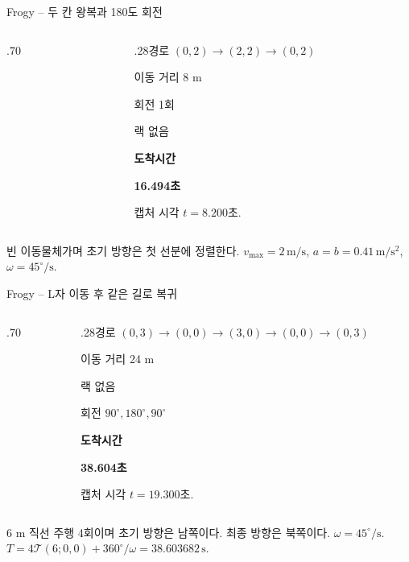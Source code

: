 \begin{frame}{Frogy -- 두 칸 왕복과 180도 회전}
\begin{columns}[T,onlytextwidth]
\begin{column}{.70\textwidth}\end{column}
\begin{column}{.28\textwidth}\small 경로 $(0,2)\to(2,2)\to(0,2)$\par\medskip 이동 거리 8 m\par 회전 1회\par 랙 없음\par\medskip\textbf{도착시간}\par\textbf{16.494초}\par\medskip 캡처 시각 $t=8.200$초.\end{column}
\end{columns}
\vspace{1mm}
{\tiny\texttt{}\par \texttt{}\par 빈 이동물체가며 초기 방향은 첫 선분에 정렬한다. $v_{\max}=2\,\mathrm{m/s}$, $a=b=0.41\,\mathrm{m/s^2}$, $\omega=45^\circ/\mathrm{s}$.}
\end{frame}



\begin{frame}{Frogy -- L자 이동 후 같은 길로 복귀}
\begin{columns}[T,onlytextwidth]
\begin{column}{.70\textwidth}\end{column}
\begin{column}{.28\textwidth}\small 경로 $(0,3)\to(0,0)\to(3,0)\to(0,0)\to(0,3)$\par\medskip 이동 거리 24 m\par 랙 없음\par 회전 $90^\circ,180^\circ,90^\circ$\par\medskip\textbf{도착시간}\par\textbf{38.604초}\par\medskip 캡처 시각 $t=19.300$초.\end{column}
\end{columns}
\vspace{1mm}
{\tiny\texttt{}\par
\texttt{}\par
6 m 직선 주행 4회이며 초기 방향은 남쪽이다. 최종 방향은 북쪽이다. $\omega=45^\circ/\mathrm{s}$. $T=4\mathcal T(6;0,0)+360^\circ/\omega=38.603682\,\mathrm{s}$.}
\end{frame}

